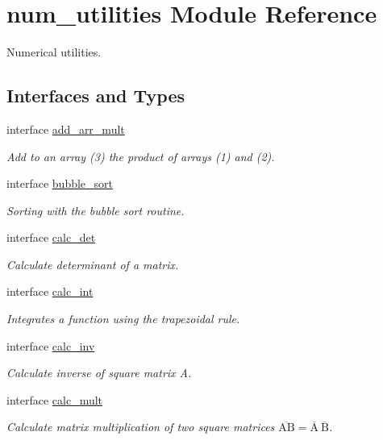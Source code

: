 \hypertarget{namespacenum__utilities}{}\section{num\+\_\+utilities Module Reference}
\label{namespacenum__utilities}


Numerical utilities.  


\subsection*{Interfaces and Types}
\begin{DoxyCompactItemize}
\item 
interface \hyperlink{interfacenum__utilities_1_1add__arr__mult}{add\+\_\+arr\+\_\+mult}
\begin{DoxyCompactList}\small\item\em Add to an array (3) the product of arrays (1) and (2). \end{DoxyCompactList}\item 
interface \hyperlink{interfacenum__utilities_1_1bubble__sort}{bubble\+\_\+sort}
\begin{DoxyCompactList}\small\item\em Sorting with the bubble sort routine. \end{DoxyCompactList}\item 
interface \hyperlink{interfacenum__utilities_1_1calc__det}{calc\+\_\+det}
\begin{DoxyCompactList}\small\item\em Calculate determinant of a matrix. \end{DoxyCompactList}\item 
interface \hyperlink{interfacenum__utilities_1_1calc__int}{calc\+\_\+int}
\begin{DoxyCompactList}\small\item\em Integrates a function using the trapezoidal rule. \end{DoxyCompactList}\item 
interface \hyperlink{interfacenum__utilities_1_1calc__inv}{calc\+\_\+inv}
\begin{DoxyCompactList}\small\item\em Calculate inverse of square matrix {\ttfamily A}. \end{DoxyCompactList}\item 
interface \hyperlink{interfacenum__utilities_1_1calc__mult}{calc\+\_\+mult}
\begin{DoxyCompactList}\small\item\em Calculate matrix multiplication of two square matrices $\overline{\text{AB}} = \overline{\text{A}} \ \overline{\text{B}}$. \end{DoxyCompactList}\item 

\end{DoxyCompactItemize}
